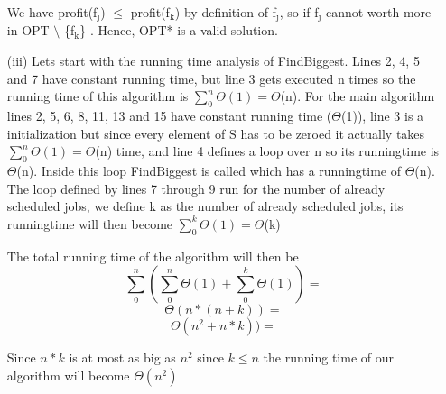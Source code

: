 \documentclass{article}
\renewcommand{\leq}{\leqslant}
\newcounter{rcounter}
\newenvironment{rlist}%
{\begin{list}{A.1-\arabic{rcounter}}{\usecounter{rcounter}}}{\end{list}}
\begin{document}
\begin{rlist}
\begin{itemize}
We have profit(f$_{\text{j}}$) $\leq$ profit(f$_{\text{k}}$) by definition of f$_{\text{j}}$, so if f$_{\text{j}}$ cannot worth more in OPT $\setminus$ \{f$_{\text{k}}$\} . Hence, OPT* is a valid solution.

      \item[(iii)] Lets start with the running time analysis of FindBiggest. Lines 2, 4, 5 and 7 have constant running time, but line 3 gets executed n times so the running time of this algorithm is $\sum_0^n\Theta(1)=\Theta$(n). For the main algorithm lines 2, 5, 6, 8, 11, 13 and 15 have constant running time ($\Theta$(1)), line 3 is a initialization but since every element of S has to be zeroed it actually takes $\sum_0^n\Theta(1)=\Theta$(n) time, and line 4 defines a loop over n so its runningtime is $\Theta$(n). Inside this loop FindBiggest is called which has a runningtime of $\Theta$(n). The loop defined by lines 7 through 9 run for the number of already scheduled jobs, we define k as the number of already scheduled jobs, its runningtime will then become $\sum_0^k\Theta(1)=\Theta$(k)

The total running time of the algorithm will then be
 \[\sum_0^n(\sum_0^n\Theta(1)+\sum_0^k\Theta(1))=\] 
\[\Theta(n*(n+k))=\]
\[\Theta(n^2+n*k))=\]

Since $n*k$ is at most as big as $n^2$ since $k\leq n$ the running time of our algorithm will become $\Theta(n^2)$
      \end{itemize}
\end{rlist}
\end{document}
